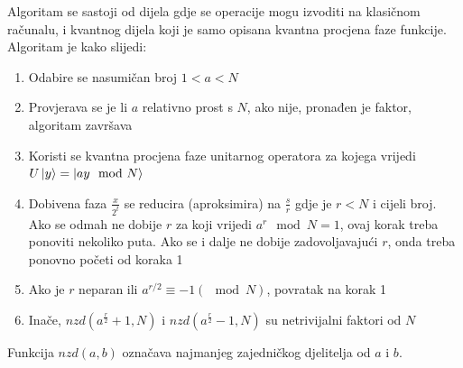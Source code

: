 Algoritam se sastoji od dijela gdje se operacije mogu izvoditi na klasičnom računalu, i kvantnog dijela koji je samo opisana kvantna procjena faze funkcije. Algoritam je kako slijedi:
\begin{enumerate}
\item Odabire se nasumičan broj $1 < a < N$
\item Provjerava se je li $a$ relativno prost s $N$, ako nije, pronađen je faktor, algoritam završava
\item Koristi se kvantna procjena faze unitarnog operatora za kojega vrijedi $U\ket{y} = \ket{ay\mod N}$
\item Dobivena faza $\frac{x}{2^t}$ se reducira (aproksimira) na $\frac{s}{r}$ gdje je $r < N$ i cijeli broj. Ako se odmah ne dobije $r$ za koji vrijedi $a^r \mod N = 1$, ovaj korak treba ponoviti nekoliko puta. Ako se i dalje ne dobije zadovoljavajući $r$, onda treba ponovno početi od koraka 1
\item Ako je $r$ neparan ili $a^{r/2} \equiv -1 (\mod N)$, povratak na korak 1
\item Inače, $nzd(a^{\frac{r}{2}} + 1, N)$ i $nzd(a^{\frac{r}{2}} - 1, N)$ su netrivijalni faktori od $N$
\end{enumerate}
Funkcija $nzd(a, b)$ označava najmanjeg zajedničkog djelitelja od $a$ i $b$.





































